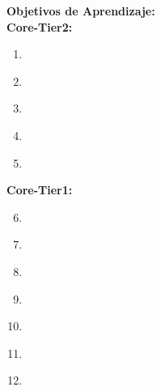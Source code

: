 \noindent \textbf{Objetivos de Aprendizaje:}\\
\noindent \textbf{Core-Tier2:}
\begin{enumerate}
	\setcounter{enumi}{0}
	\item \ALBasicAnalysisLOUse\xspace[\ALBasicAnalysisLOUseLevel]\label{sec:BOK:ALBasicAnalysisLOUse}
	\item \ALBasicAnalysisLOUseBig\xspace[\ALBasicAnalysisLOUseBigLevel]\label{sec:BOK:ALBasicAnalysisLOUseBig}
	\item \ALBasicAnalysisLOExplainThe\xspace[\ALBasicAnalysisLOExplainTheLevel]\label{sec:BOK:ALBasicAnalysisLOExplainThe}
	\item \ALBasicAnalysisLOUseRecurrence\xspace[\ALBasicAnalysisLOUseRecurrenceLevel]\label{sec:BOK:ALBasicAnalysisLOUseRecurrence}
	\item \ALBasicAnalysisLOSolve\xspace[\ALBasicAnalysisLOSolveLevel]\label{sec:BOK:ALBasicAnalysisLOSolve}
\end{enumerate}
\noindent \textbf{Core-Tier1:}
\begin{enumerate}
	\setcounter{enumi}{5}
	\item \ALBasicAnalysisLOExplain\xspace[\ALBasicAnalysisLOExplainLevel]\label{sec:BOK:ALBasicAnalysisLOExplain}
	\item \ALBasicAnalysisLOIn\xspace[\ALBasicAnalysisLOInLevel]\label{sec:BOK:ALBasicAnalysisLOIn}
	\item \ALBasicAnalysisLODetermine\xspace[\ALBasicAnalysisLODetermineLevel]\label{sec:BOK:ALBasicAnalysisLODetermine}
	\item \ALBasicAnalysisLOState\xspace[\ALBasicAnalysisLOStateLevel]\label{sec:BOK:ALBasicAnalysisLOState}
	\item \ALBasicAnalysisLOList\xspace[\ALBasicAnalysisLOListLevel]\label{sec:BOK:ALBasicAnalysisLOList}
	\item \ALBasicAnalysisLOPerform\xspace[\ALBasicAnalysisLOPerformLevel]\label{sec:BOK:ALBasicAnalysisLOPerform}
	\item \ALBasicAnalysisLOGive\xspace[\ALBasicAnalysisLOGiveLevel]\label{sec:BOK:ALBasicAnalysisLOGive}
\end{enumerate}


